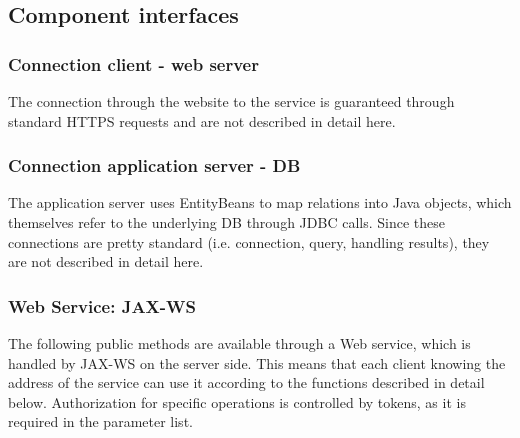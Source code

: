 \pagebreak
\subsection{Component interfaces}
\label{sub:component_interfaces}

\subsubsection{Connection client - web server} %
\label{ssub:https}
The connection through the website to the service is guaranteed through standard HTTPS requests and are not described in detail here.

\subsubsection{Connection application server - DB} %
\label{ssub:connection_application_server_db}
The application server uses EntityBeans to map relations into Java objects, which themselves refer to the underlying DB through JDBC calls. Since these connections are pretty standard (i.e. connection, query, handling results), they are not described in detail here.

\subsubsection{Web Service: JAX-WS} %
\label{ssub:web_service_jax_ws}
The following public methods are available through a Web service, which is handled by JAX-WS on the server side. This means that each client knowing the address of the service can use it according to the functions described in detail below. Authorization for specific operations is controlled by tokens, as it is required in the parameter list.

\pagebreak
